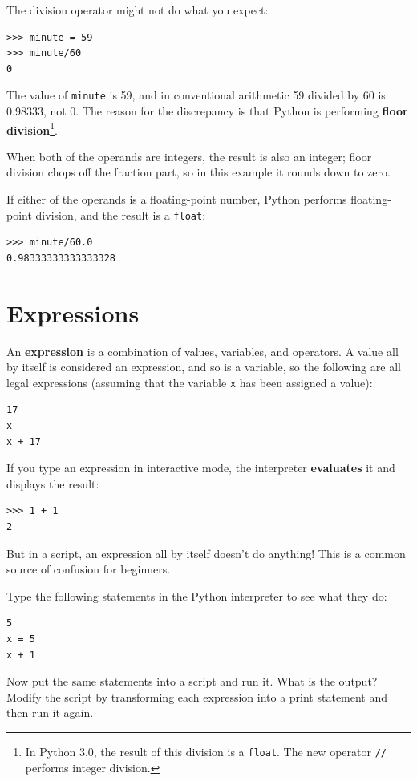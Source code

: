 \documentclass[10pt]{book}
\begin{document}
The division operator might not do what you expect:

\beforeverb
\begin{verbatim}
>>> minute = 59
>>> minute/60
0
\end{verbatim}
\afterverb
%
The value of {\tt minute} is 59, and in conventional arithmetic 59
divided by 60 is 0.98333, not 0.  The reason for the discrepancy is
that Python is performing {\bf floor division}\footnote{In Python 3.0,
the result of this division is a {\tt float}.  The new operator
{\tt //} performs integer division.}.


When both of the operands are integers, the result is also an
integer; floor division chops off the fraction
part, so in this example it rounds down to zero.

If either of the operands is a floating-point number, Python performs
floating-point division, and the result is a {\tt float}:

\beforeverb
\begin{verbatim}
>>> minute/60.0
0.98333333333333328
\end{verbatim}
\afterverb


\section{Expressions}

An {\bf expression} is a combination of values, variables, and operators.
A value all by itself is considered an expression, and so is
a variable, so the following are all legal expressions
(assuming that the variable {\tt x} has been assigned a value):


\beforeverb
\begin{verbatim}
17
x
x + 17
\end{verbatim}
\afterverb
%
If you type an expression in interactive mode, the interpreter
{\bf evaluates} it and displays the result:

\beforeverb
\begin{verbatim}
>>> 1 + 1
2
\end{verbatim}
\afterverb
%
But in a script, an expression all by itself doesn't
do anything!  This is a common
source of confusion for beginners.

\begin{ex}
Type the following statements in the Python interpreter to see
what they do:

\beforeverb
\begin{verbatim}
5
x = 5
x + 1
\end{verbatim}
\afterverb
%
Now put the same statements into a script and run it.  What
is the output?  Modify the script by transforming each
expression into a print statement and then run it again.
\end{ex}
\end{document}
